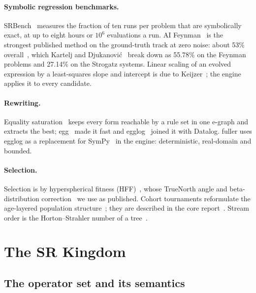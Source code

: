 \documentclass[sigconf,nonacm]{acmart}
\begin{document}
\paragraph{Symbolic regression benchmarks.} SRBench~\cite{lacava2021srbench}
measures the fraction of ten runs per problem that are symbolically exact, at
up to eight hours or $10^6$ evaluations a run. AI Feynman~\cite{udrescu2020aifeynman}
is the strongest published method on the ground-truth track at zero noise:
about 53\% overall~\cite{lacava2021srbench}, which Kartelj and
Djukanovi\'c~\cite{kartelj2023rilsrols} break down as 55.78\% on the Feynman
problems and 27.14\% on the Strogatz systems. Linear scaling of an evolved
expression by a least-squares slope and intercept is due to
Keijzer~\cite{keijzer2003scaling}; the engine applies it to every candidate.

\paragraph{Rewriting.} Equality saturation~\cite{tate2009equality} keeps every
form reachable by a rule set in one e-graph and extracts the best;
egg~\cite{willsey2021egg} made it fast and egglog~\cite{egglog} joined it with
Datalog. fuller uses egglog as a replacement for SymPy~\cite{meurer2017sympy}
in the engine: deterministic, real-domain and bounded.

\paragraph{Selection.} Selection is by hyperspherical fitness
(HFF)~\cite{morgan2026hff}, whose TrueNorth angle and beta-distribution
correction~\cite{cai2013angles} we use as published. Cohort tournaments
reformulate the age-layered population structure~\cite{hornby2006alps}; they
are described in the core report~\cite{morgan_core}. Stream order is the
Horton--Strahler number of a tree~\cite{horton1945streams,strahler1957watershed}.

\section{The SR Kingdom}
\label{sec:kingdom}

\subsection{The operator set and its semantics}
\end{document}
